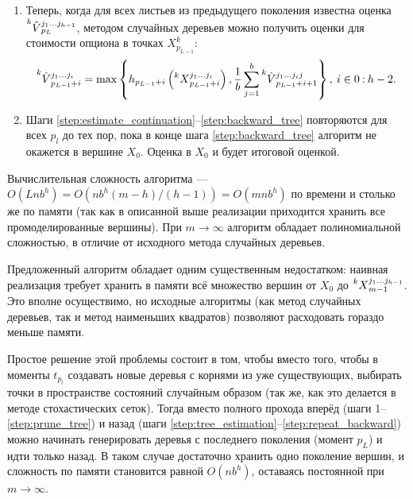 \begin{enumerate}[noitemsep]
	\item\label{step:backward_tree} Теперь, когда для всех листьев из предыдущего поколения известна оценка $\prescript{k}{}{\hat{V}}_{p_L}^{j_1 \ldots j_{h-1}}$, методом случайных деревьев можно получить оценки для стоимости опциона в точках $X_{p_{L-1}}^k$:
	$$\prescript{k}{}{\hat{V}}_{p_{L-1}+i}^{j_1 \ldots j_i} = \max \left\lbrace h_{p_{L-1}+i} \left( \prescript{k}{}{X}_{p_{L-1}+i}^{j_1 \ldots j_i} \right), \frac{1}{b} \sum_{j = 1}^b \prescript{k}{}{\hat{V}}_{p_{L-1}+i+1}^{j_1 \ldots j_i j}\right\rbrace, \: i\in{0\mathbin{:} {h-2}}.$$

	\item\label{step:repeat_backward} Шаги \ref{step:estimate_continuation}--\ref{step:backward_tree} повторяются для всех $p_l$ до тех пор, пока в конце шага \ref{step:backward_tree} алгоритм не окажется в вершине $X_0$. Оценка в $X_0$ и будет итоговой оценкой.
\end{enumerate}

Вычислительная сложность алгоритма --- $O(Lnb^h) = O(nb^h (m-h) / (h-1)) = O(mnb^h)$ по времени и столько же по памяти (так как в описанной выше реализации приходится хранить все промоделированные вершины). При $m\to\infty$ алгоритм обладает полиномиальной сложностью, в отличие от исходного метода случайных деревьев.

Предложенный алгоритм обладает одним существенным недостатком: наивная реализация требует хранить в памяти всё множество вершин от $X_0$ до $\prescript{k}{}{X}_{m-1}^{j_1 \ldots j_{h-1}}$. Это вполне осуществимо, но исходные алгоритмы (как метод случайных деревьев, так и метод наименьших квадратов) позволяют расходовать гораздо меньше памяти.

Простое решение этой проблемы состоит в том, чтобы вместо того, чтобы в моменты $t_{p_l}$ создавать новые деревья с корнями из уже существующих, выбирать точки в пространстве состояний случайным образом (так же, как это делается в методе стохастических сеток). Тогда вместо полного прохода вперёд (шаги 1--\ref{step:prune_tree}) и назад (шаги \ref{step:tree_estimation}--\ref{step:repeat_backward}) можно начинать генерировать деревья с последнего поколения (момент $p_L$) и идти только назад. В таком случае достаточно хранить одно поколение вершин, и сложность по памяти становится равной $O(nb^h)$, оставаясь постоянной при $m\to\infty$.


